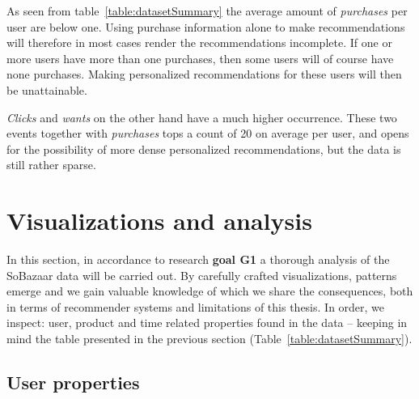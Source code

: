 As seen from table~\ref{table:datasetSummary} the average amount of
\emph{purchases} per user are below one. Using purchase information alone to
make recommendations will therefore in most cases render the recommendations
incomplete. If one or more users have more than one purchases, then some users
will of course have none purchases. Making personalized recommendations for
these users will then be unattainable.

\emph{Clicks} and \emph{wants} on the other hand have a much higher occurrence.
These two events together with \emph{purchases} tops a count of 20 on average
per user, and opens for the possibility of more dense personalized
recommendations, but the data is still rather sparse.

\section{Visualizations and analysis}

In this section, in accordance to research \textbf{goal G1} a thorough analysis
of the SoBazaar data will be carried out. By carefully crafted visualizations,
patterns emerge and we gain valuable knowledge of which we share the
consequences, both in terms of recommender systems and limitations of this
thesis. In order, we inspect: user, product and time related properties found in
the data -- keeping in mind the table presented in the previous section
(Table~\ref{table:datasetSummary}).

\subsection{User properties}


